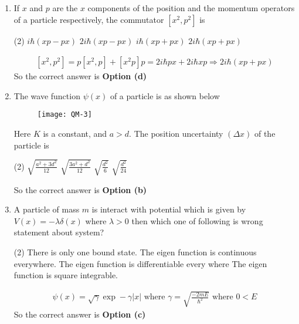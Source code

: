 \begin{enumerate}
\item If $x$ and $p$ are the $x$ components of the position and the momentum operators of a particle respectively, the commutator $\left[x^{2}, p^{2}\right]$ is
 \begin{tasks}(2)
	\task[\textbf{a.}]$i \hbar(x p-p x)$
	\task[\textbf{b.}] $2 i \hbar(x p-p x)$
	\task[\textbf{c.}]$i \hbar(x p+p x)$
	\task[\textbf{d.}] $2 i \hbar(x p+p x)$
\end{tasks}
\begin{answer}
	$$
	\begin{aligned}
	\left[x^{2}, p^{2}\right]=p\left[x^{2}, p\right]+\left[x^{2} p\right] p=2 i \hbar p x+2 i \hbar x p \Rightarrow 2 i \hbar(x p+p x)
\end{aligned}
$$
So the correct answer is \textbf{Option (d)}
\end{answer}
\item The wave function $\psi(x)$ of a particle is as shown below
\begin{figure}[H]
	\centering
	\texttt{[image: QM-3]}
\end{figure}
Here $K$ is a constant, and $a>d$. The position uncertainty $(\Delta x)$ of the particle is
 \begin{tasks}(2)
	\task[\textbf{a.}]$\sqrt{\frac{a^{2}+3 d^{2}}{12}}$
	\task[\textbf{b.}] $\sqrt{\frac{3 a^{2}+d^{2}}{12}}$
	\task[\textbf{c.}]$\sqrt{\frac{d^{2}}{6}}$
	\task[\textbf{d.}] $\sqrt{\frac{d^{2}}{24}}$
\end{tasks}
\begin{answer}
So the correct answer is \textbf{Option (b)}
\end{answer}
\item A particle of mass $m$ is interact with potential which is given by $V(x)=-\lambda \delta(x)$ where $\lambda>0$ then which one of following is wrong statement about system?
 \begin{tasks}(2)
	\task[\textbf{a.}]There is only one bound state.
	\task[\textbf{b.}]The eigen function is continuous everywhere.
	\task[\textbf{c.}]The eigen function is differentiable every where
	\task[\textbf{d.}] The eigen function is square integrable.
\end{tasks}
\begin{answer}
	$$
	\begin{aligned}
	\psi(x)=\sqrt{\gamma} \exp -\gamma|x| \text { where } \gamma=\sqrt{\frac{-2 m E}{\hbar^{2}}} \text { where } 0<E
\end{aligned}
$$
So the correct answer is \textbf{Option (c)}

\end{answer}
\end{enumerate}

